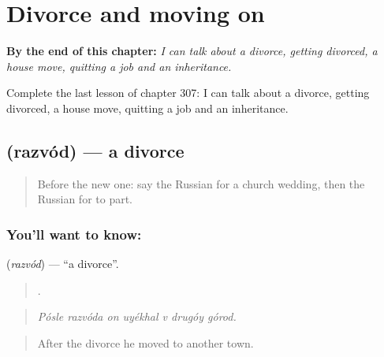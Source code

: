 
\chapter{Divorce and moving on}
\label{ch:ru-divorce-and-moving-on}

\begin{chapteropening}
\textbf{By the end of this chapter:} \emph{I can talk about a divorce, getting divorced, a house move, quitting a job and an inheritance.}

Complete the last lesson of chapter 307: I can talk about a divorce, getting divorced, a house move, quitting a job and an inheritance.
\end{chapteropening}

\section[\texorpdfstring{\ru{развод} (razvód)}{развод (razvód)}]{ (razvód) — a divorce}

\label{lesson:RU-C307-razvod}



\begin{quote}
Before the new one: say the Russian for a church wedding, then the Russian for to part.
\end{quote}

\subsection*{You'll want to know: }
\textbf{} (\emph{razvód}) — \textquotedblleft{}a divorce\textquotedblright{}.

\begin{quote}
      .
\end{quote}

\begin{quote}
\emph{Pósle razvóda on uyékhal v drugóy górod.}
\end{quote}

\begin{quote}
After the divorce he moved to another town.
\end{quote}


